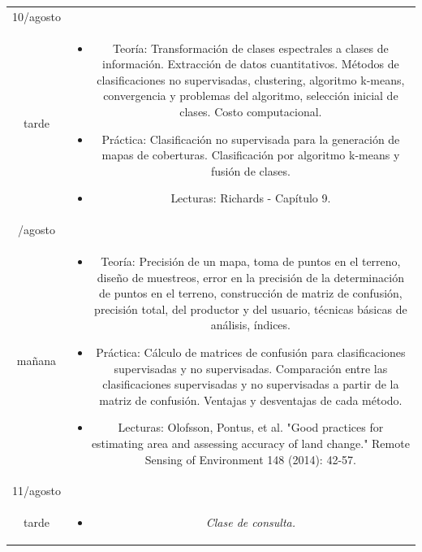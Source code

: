 \documentclass[11pt]{article}
\begin{document}
\begin{longtable}[h!]{ c  c  }
\midrule
10/agosto \\ tarde& \begin{minipage}{.65\textwidth}
\begin{itemize}
    \vspace{1mm}
	\item Teoría: Transformación de clases espectrales a clases de información. Extracción de datos cuantitativos. Métodos de clasificaciones no supervisadas, clustering, algoritmo k-means, convergencia y problemas del algoritmo, selección inicial de clases. Costo computacional.
  \item Práctica: Clasificación no supervisada para la generación de mapas de coberturas. Clasificación por algoritmo k-means y fusión de clases.
	\item Lecturas: Richards - Capítulo 9.
    \vspace{1mm}
\end{itemize}
\end{minipage} \\
\newpage
\midrule
11/agosto \\ ma\~nana & \begin{minipage}{.65\textwidth}
\begin{itemize}
    \vspace{1mm}
	\item Teoría: Precisión de un mapa, toma de puntos en el terreno, diseño de muestreos, error en la precisión de la determinación de puntos en el terreno, construcción de matriz de confusión, precisión total, del productor y del usuario, técnicas básicas de análisis, índices.
  \item Práctica: Cálculo de matrices de confusión para clasificaciones supervisadas y no supervisadas. Comparación entre las clasificaciones supervisadas y no supervisadas a partir de la matriz de confusión. Ventajas y desventajas de cada método.
	\item Lecturas: Olofsson, Pontus, et al. "Good practices for estimating area and assessing accuracy of land change." Remote Sensing of Environment 148 (2014): 42-57.
    \vspace{1mm}
\end{itemize}
\end{minipage} \\

\midrule
    \vspace{1mm}
11/agosto \\ tarde& \begin{minipage}{.65\textwidth}
\begin{itemize}
\item \emph{Clase de consulta.}
\end{itemize}
\end{minipage} \\
\bottomrule

\end{longtable}
\end{document}
